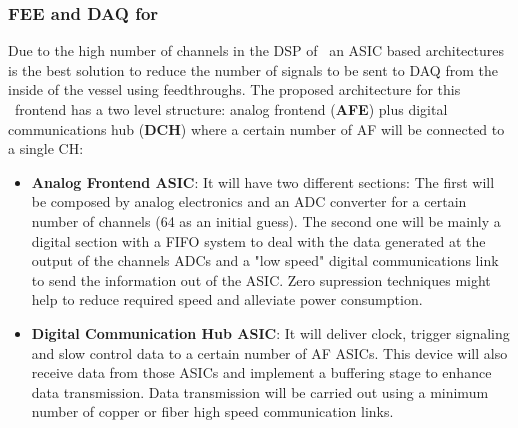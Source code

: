 


 
\subsubsection*{FEE and DAQ for \NHD}

Due to the high number of channels in the DSP of \NHD\ an ASIC based architectures is the best solution to reduce the number of signals to be sent to DAQ from the inside of the vessel using feedthroughs. The proposed architecture for this \NHD\ frontend has a two level structure: analog frontend ({\bf AFE}) plus digital communications hub ({\bf DCH}) where a certain number of AF will be connected to a single CH:
\begin{itemize}
    \item {\bf Analog Frontend ASIC}: It will have two different sections: The first will be composed by analog electronics and an ADC converter for a certain number of channels (64 as an initial guess). The second one will be mainly a digital section with a FIFO system to deal with the data generated at the output of the channels ADCs and a "low speed" digital communications link to send the information out of the ASIC. Zero supression techniques might help to reduce required speed and alleviate power consumption.
    \item {\bf Digital Communication Hub ASIC}: It will deliver clock, trigger signaling and slow control data to a certain number of AF ASICs. This device will also receive data from those ASICs and implement a buffering stage to enhance data transmission. Data transmission will be carried out using a minimum number of copper or fiber high speed communication links.
\end{itemize}

